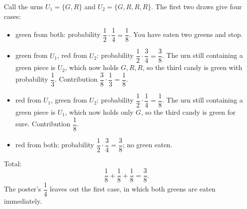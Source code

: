 Call the urns $U_1=\{G,R\}$ and $U_2=\{G,R,R,R\}$. The first two draws give four cases:
\begin{itemize}
\item green from both: probability $\dfrac{1}{2}\cdot\dfrac{1}{4}=\dfrac{1}{8}$. You have eaten two greens and stop.
\item green from $U_1$, red from $U_2$: probability $\dfrac{1}{2}\cdot\dfrac{3}{4}=\dfrac{3}{8}$. The urn still containing a green piece is $U_2$, which now holds $G,R,R$, so the third candy is green with probability $\dfrac{1}{3}$. Contribution $\dfrac{3}{8}\cdot\dfrac{1}{3}=\dfrac{1}{8}$.
\item red from $U_1$, green from $U_2$: probability $\dfrac{1}{2}\cdot\dfrac{1}{4}=\dfrac{1}{8}$. The urn still containing a green piece is $U_1$, which now holds only $G$, so the third candy is green for sure. Contribution $\dfrac{1}{8}$.
\item red from both: probability $\dfrac{1}{2}\cdot\dfrac{3}{4}=\dfrac{3}{8}$; no green eaten.
\end{itemize}
Total:
\[
\dfrac{1}{8}+\dfrac{1}{8}+\dfrac{1}{8}=\boxed{\dfrac{3}{8}}.
\]
The poster's $\dfrac{1}{4}$ leaves out the first case, in which both greens are eaten immediately.
